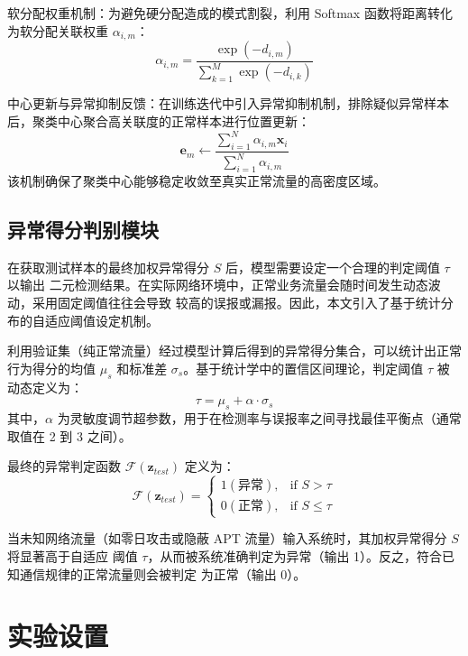 软分配权重机制：为避免硬分配造成的模式割裂，利用 Softmax 函数将距离转化为软分配关联权重 $\alpha_{i,m}$：
\begin{equation}
    \alpha_{i,m} = \frac{\exp(-d_{i,m})}{\sum_{k=1}^{M} \exp(-d_{i,k})}
\end{equation}

中心更新与异常抑制反馈：在训练迭代中引入异常抑制机制，排除疑似异常样本后，聚类中心聚合高关联度的正常样本进行位置更新：
\begin{equation}
    \mathbf{e}_m \leftarrow \frac{\sum_{i=1}^{N} \alpha_{i,m} \mathbf{x}_i}{\sum_{i=1}^{N} \alpha_{i,m}}
\end{equation}
该机制确保了聚类中心能够稳定收敛至真实正常流量的高密度区域。

\subsection{异常得分判别模块}
在获取测试样本的最终加权异常得分 $S$ 后，模型需要设定一个合理的判定阈值 $\tau$ 以输出
二元检测结果。在实际网络环境中，正常业务流量会随时间发生动态波动，采用固定阈值往往会导致
较高的误报或漏报。因此，本文引入了基于统计分布的自适应阈值设定机制。

利用验证集（纯正常流量）经过模型计算后得到的异常得分集合，可以统计出正常行为得分的均值 
$\mu_s$ 和标准差 $\sigma_s$。基于统计学中的置信区间理论，判定阈值 $\tau$ 被动态定义为：
\begin{equation}
    \tau = \mu_s + \alpha \cdot \sigma_s
\end{equation}
其中，$\alpha$ 为灵敏度调节超参数，用于在检测率与误报率之间寻找最佳平衡点（通常取值在 
2 到 3 之间）。

最终的异常判定函数 $\mathcal{F}(\mathbf{z}_{test})$ 定义为：
\begin{equation}
    \mathcal{F}(\mathbf{z}_{test}) = 
    \begin{cases} 
    1 (\text{异常}), & \text{if } S > \tau \\
    0 (\text{正常}), & \text{if } S \le \tau 
    \end{cases}
\end{equation}

当未知网络流量（如零日攻击或隐蔽 APT 流量）输入系统时，其加权异常得分 $S$ 将显著高于自适应
阈值 $\tau$，从而被系统准确判定为异常（输出 1）。反之，符合已知通信规律的正常流量则会被判定
为正常（输出 0）。

\section{实验设置}

